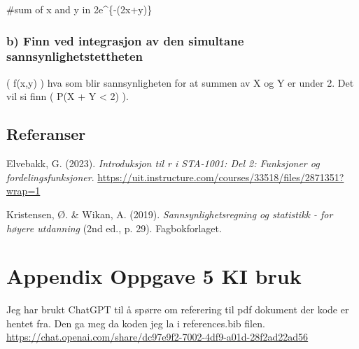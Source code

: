 \documentclass[
  12pt,
  a4paper,
  DIV=11,
  numbers=noendperiod]{scrartcl}
\newenvironment{Shaded}{\begin{snugshade}}{\end{snugshade}}
\newcommand{\CommentTok}[1]{\textcolor[rgb]{0.37,0.37,0.37}{#1}}
\newlength{\cslhangindent}
\newenvironment{CSLReferences}[2] %
 {\begin{list}{}{%
  \setlength{\itemindent}{0pt}
  \setlength{\leftmargin}{0pt}
  \setlength{\parsep}{0pt}
  \ifodd #1
   \setlength{\leftmargin}{\cslhangindent}
   \setlength{\itemindent}{-1\cslhangindent}
  \fi
  \setlength{\itemsep}{#2\baselineskip}}}
 {\end{list}}
\begin{document}
\begin{Shaded}
\begin{Highlighting}[]
\CommentTok{\#sum of x and y in 2e\^{}\{{-}(2x+y)\}}
\end{Highlighting}
\end{Shaded}

\subsubsection{b) Finn ved integrasjon av den simultane
sannsynlighetstettheten}\label{b-finn-ved-integrasjon-av-den-simultane-sannsynlighetstettheten}

( f(x,y) ) hva som blir sannsynligheten for at summen av X og Y er under
2. Det vil si finn ( P(X + Y \textless{} 2) ).

\clearpage

\subsection{Referanser}\label{referanser}

\label{refs}
\begin{CSLReferences}{1}{0}
Elvebakk, G. (2023). \emph{Introduksjon til r i STA-1001: Del 2:
Funksjoner og fordelingsfunksjoner}.
\url{https://uit.instructure.com/courses/33518/files/2871351?wrap=1}

Kristensen, Ø. \& Wikan, A. (2019). \emph{Sannsynlighetsregning og
statistikk - for høyere utdanning} (2nd ed., p. 29). Fagbokforlaget.

\end{CSLReferences}

\clearpage

\appendix

\section {Appendix Oppgave 5 KI bruk}

Jeg har brukt ChatGPT til å spørre om referering til pdf dokument der
kode er hentet fra. Den ga meg da koden jeg la i references.bib filen.
\url{https://chat.openai.com/share/dc97e9f2-7002-4df9-a01d-28f2ad22ad56}
\end{document}
